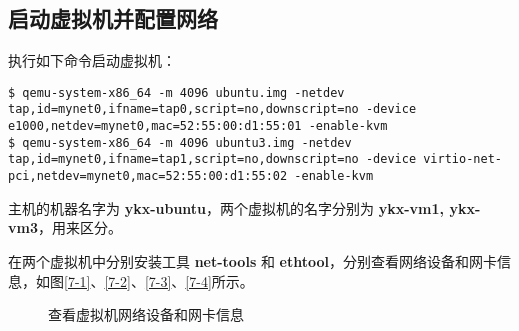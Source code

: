 \documentclass[UTF8,12pt]{ctexart}
\numberwithin{equation}{section}
\begin{document}
\subsection{启动虚拟机并配置网络}
执行如下命令启动虚拟机：
\begin{lstlisting}[breaklines=true]
$ qemu-system-x86_64 -m 4096 ubuntu.img -netdev tap,id=mynet0,ifname=tap0,script=no,downscript=no -device e1000,netdev=mynet0,mac=52:55:00:d1:55:01 -enable-kvm
$ qemu-system-x86_64 -m 4096 ubuntu3.img -netdev tap,id=mynet0,ifname=tap1,script=no,downscript=no -device virtio-net-pci,netdev=mynet0,mac=52:55:00:d1:55:02 -enable-kvm
\end{lstlisting}
主机的机器名字为 \textbf{ykx-ubuntu}，两个虚拟机的名字分别为 \textbf{ykx-vm1, ykx-vm3}，用来区分。

在两个虚拟机中分别安装工具 \textbf{net-tools} 和 \textbf{ethtool}，分别查看网络设备和网卡信息，如图\autoref{7-1}、\autoref{7-2}、\autoref{7-3}、\autoref{7-4}所示。
\begin{figure}[H]
    \centering

    \label{vmifconfig}
    \caption{查看虚拟机网络设备和网卡信息}
\end{figure}
\end{document}
